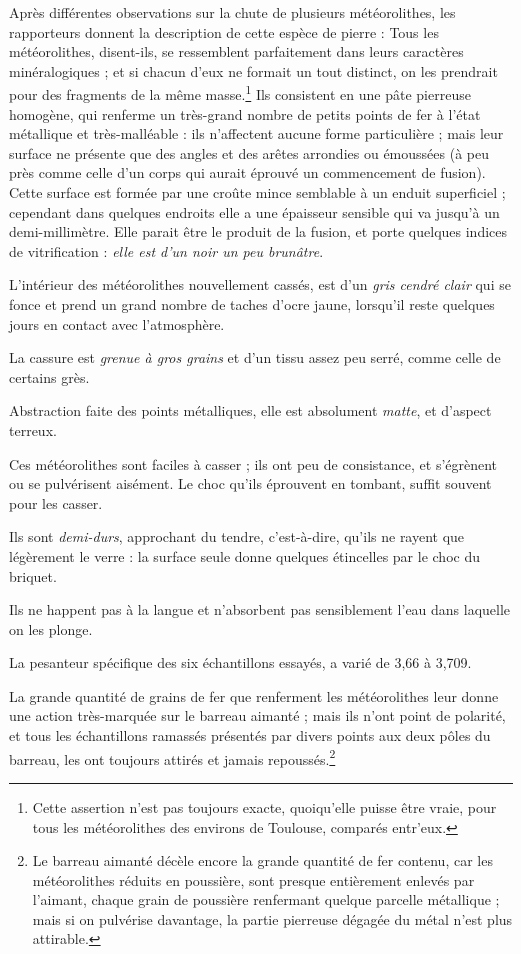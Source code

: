 \documentclass[a4paper, 12pt, oneside, french]{article}
\begin{document}
\og Après différentes observations sur la chute de plusieurs météorolithes, les rapporteurs donnent la description de cette espèce de pierre : Tous les météorolithes, disent-ils, se ressemblent parfaitement dans leurs caractères minéralogiques ; et si chacun d'eux ne formait un tout distinct, on les prendrait pour des fragments de la même masse.\footnote{Cette assertion n'est pas toujours exacte, quoiqu'elle puisse être vraie, pour tous les météorolithes des environs de Toulouse, comparés entr'eux.} Ils consistent en une pâte pierreuse homogène, qui renferme un très-grand nombre de petits points de fer à l'état métallique et très-malléable : ils n'affectent aucune forme particulière ; mais leur surface ne présente que des angles et des arêtes arrondies ou émoussées (à peu près comme celle d'un corps qui aurait éprouvé un commencement de fusion). Cette surface est formée par une croûte mince semblable à un enduit superficiel ; cependant dans quelques endroits elle a une épaisseur sensible qui va jusqu'à un demi-millimètre. Elle parait être le produit de la fusion, et porte quelques indices de vitrification : \emph{elle est d'un noir un peu brunâtre}. \fg

\og L'intérieur des météorolithes nouvellement cassés, est d'un \emph{gris cendré clair} qui se fonce et prend un grand nombre de taches d'ocre jaune, lorsqu'il reste quelques jours en contact avec l'atmosphère. \fg

\og La cassure est \emph{grenue à gros grains} et d'un tissu assez peu serré, comme celle de certains grès. \fg

\og Abstraction faite des points métalliques, elle est absolument \emph{matte}, et d'aspect terreux. \fg

\og Ces météorolithes sont faciles à casser ; ils ont peu de consistance, et s'égrènent ou se pulvérisent aisément. Le choc qu'ils éprouvent en tombant, suffit souvent pour les casser. \fg

\og Ils sont \emph{demi-durs}, approchant du tendre, c'est-à-dire, qu'ils ne rayent que légèrement le verre : la surface seule donne quelques étincelles par le choc du briquet. \fg

\og Ils ne happent pas à la langue et n'absorbent pas sensiblement l'eau dans laquelle on les plonge. \fg

\og La pesanteur spécifique des six échantillons essayés, a varié de 3,66 à 3,709. \fg

\og La grande quantité de grains de fer que renferment les météorolithes leur donne une action très-marquée sur le barreau aimanté ; mais ils n'ont point de polarité, et tous les échantillons ramassés présentés par divers points aux deux pôles du barreau, les ont toujours attirés et jamais repoussés.\footnote{\og Le barreau aimanté décèle encore la grande quantité de fer contenu, car les météorolithes réduits en poussière, sont presque entièrement enlevés par l'aimant, chaque grain de poussière renfermant quelque parcelle métallique ; mais si on pulvérise davantage, la partie pierreuse dégagée du métal n'est plus attirable. \fg} \fg
\end{document}
